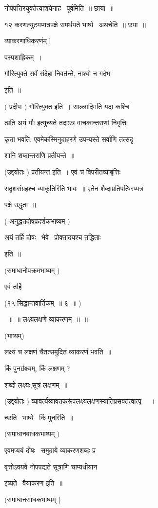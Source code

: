 \documentclass[11pt, openany]{book}
\begin{document}
नोपपत्तिरयुक्तेत्याशयेनाह \textendash\ पूर्वमिति~॥ छाया~॥ 

१२ करणल्युटमप्यत्रपक्षे समर्थयते भाष्ये \textendash\ अथचेति~॥ छया~॥ 

व्याकरणाधिकरणंम् ] 

पस्पशाह्रिकम्~। 



 

गौरित्युक्ते सर्वं संदेहा निवर्तन्ते, नाश्वो न गर्दभ 

इति~॥ 

( प्रदीपः ) गौरित्युक्त इति~। साल्लादिमति यदा कश्चि \textendash\ 

{\qt त्प्रति अयं गौः} इत्युच्यते तदाऽत्र वाचकान्तराणां निवृत्तिः 

कृता भवति, एवमेकस्मिनुदाहरणे उपन्यस्ते सर्वाणि तत्सदृ \textendash\ 

शानि शब्दान्तराणि प्रतीयन्ते~॥ 

(उद्दयोतः ) प्रतीयन्त इति~। एवं च विपरीतव्याबृत्तिः 

सदृशसंग्रहश्च व्याकृतिरिति भावः~॥ एतेन शैब्दाप्रतिपत्षिरप्यत्र 

पक्षे उद्धृता~॥ 

( अनुद्धतदोषप्रदर्शकभाष्यम् ) 

अयं तर्हि दोषः \textendash\ भेवे \textendash\ प्रोक्तादयश्च तद्धिताः 

इति~॥ 

(समाधानोपक्रमभाष्यम् ) 

एवं तर्हि \textendash\ 

(१५ सिद्धान्तवार्तिकम्~॥ ६~॥ ) 

~॥~॥ लक्ष्यलक्षणे व्याकरणम्~॥~॥ 

(भाष्यम्)

लक्ष्यं च लक्षणं चैतत्समुदितं व्याकरणं भवति~॥ 

किं पुनर्छक्ष्यम्, किं लक्षणम् ? 

शब्दो लक्ष्यः,सूत्रं लक्षणम्~॥ 

(उद्दयोतः ) व्यावर्त्यव्यावतकरूंपलक्ष्यलक्षणस्यातिप्रसक्तत्वात्पृ \textendash\ ~। 

च्छति \textendash\ भाष्ये \textendash\ किं पुनरिति~॥ 

(समाधानबाधकभाष्यम् ) 

एवमप्ययं दोषः \textendash\ समुदाये व्याकरणशब्दः प्र \textendash\ 

वृत्तोऽवयवे नोपपद्यते सूत्राणि चाप्यधीयान 

इष्यते \textendash\ वैयाकरण इति~॥ 

(समाधानसाधकभाष्यम् ) 
\end{document}

